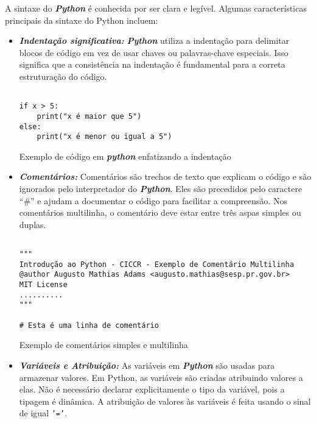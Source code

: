 \documentclass[a4paper, 12pt, onecolumn,singlespacing]{article}
\begin{document}
	A sintaxe do \textbf{\textit{Python}} é conhecida por ser clara e legível. Algumas características principais da sintaxe do Python incluem:
	
	\begin{itemize}
		
		\item \textbf{\textit{Indentação significativa:}} \textbf{\textit{Python}} utiliza a indentação para delimitar blocos de código em vez de usar chaves ou palavras-chave especiais. Isso significa que a consistência na indentação é fundamental para a correta estruturação do código.

\begin{listing}[!ht]
	\begin{verbatim}
			
if x > 5:
	print("x é maior que 5")
else:
	print("x é menor ou igual a 5")

	\end{verbatim}
	\label{exemplo_curto_identacao}
	\caption{Exemplo de código em \textbf{\textit{python}} enfatizando a indentação}
\end{listing}

	\item \textbf{\textit{Comentários:}} Comentários são trechos de texto que explicam o código e são ignorados pelo interpretador do \textit{\textbf{Python}}. Eles são precedidos pelo caractere ``\#'' e ajudam a documentar o código para facilitar a compreensão. Nos comentários multilinha, o comentário deve estar entre três aspas simples ou duplas.
	
\begin{listing}[!ht]
	\begin{verbatim}
			
"""
Introdução ao Python - CICCR - Exemplo de Comentário Multilinha
@author Augusto Mathias Adams <augusto.mathias@sesp.pr.gov.br>
MIT License
..........
"""

# Esta é uma linha de comentário

	\end{verbatim}
\label{exemplo_curto_comentário}
\caption{Exemplo de comentários simples e multilinha}
\end{listing}
	\pagebreak
	\item \textbf{\textit{Variáveis e Atribuição:}} As variáveis em \textbf{\textit{Python}} são usadas para armazenar valores. Em Python, as variáveis são criadas atribuindo valores a elas. Não é necessário declarar explicitamente o tipo da variável, pois a tipagem é dinâmica. A atribuição de valores às variáveis é feita usando o sinal de igual \texttt{'='}.
\begin{listing}[!ht]
	\begin{verbatim}
			

\end{verbatim}
\end{listing}
\end{itemize}
\end{document}
